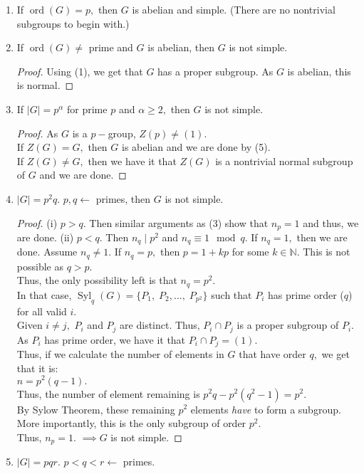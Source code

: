 \documentclass[12 pt, a4paper, toc=graduated, oneside]{article}
\theoremstyle{definition}
\newcommand{\Syl}{\operatorname{Syl}}
\newcommand{\ord}{\operatorname{ord}}
\begin{document}
\begin{enumerate}
	\item If $\ord(G) = p,$ then $G$ is abelian and simple. (There are no nontrivial subgroups to begin with.)
	\item If $\ord(G) \neq$ prime and $G$ is abelian, then $G$ is not simple.\\
	\begin{proof}
	Using (1), we get that $G$ has a proper subgroup. As $G$ is abelian, this is normal.
	\end{proof}
	\item If $|G| = p^\alpha$ for prime $p$ and $\alpha \ge 2,$ then $G$ is not simple.
	\begin{proof}
		As $G$ is a $p-$group, $Z(p) \neq (1).$\\
		If $Z(G) = G,$ then $G$ is abelian and we are done by (5).\\
		If $Z(G) \neq G,$ then we have it that $Z(G)$ is a nontrivial normal subgroup of $G$ and we are done.
	\end{proof}	
	\item $|G| = p^2q.$ $p, q \longleftarrow$ primes, then $G$ is not simple.
	\begin{proof}
		(i) $p > q.$ Then similar arguments as (3) show that $n_p = 1$ and thus, we are done.
		(ii) $p < q.$ Then $n_q \mid p^2$ and $n_q \equiv 1 \mod q.$ If $n_q = 1,$ then we are done. Assume $n_q \neq 1.$ If $n_q = p,$ then $p = 1 + kp$ for some $k \in \mathbb{N}.$ This is not possible as $q > p.$\\
		Thus, the only possibility left is that $n_q = p^2.$\\
		In that case, $\Syl_q(G) = \{P_1,\;P_2, \ldots,\; P_{p^2}\}$ such that $P_i$ has prime order ($q$) for all valid $i.$\\
		Given $i \neq j,$ $P_i$ and $P_j$ are distinct. Thus, $P_i \cap P_j$ is a proper subgroup of $P_i.$ As $P_i$ has prime order, we have it that $P_i \cap P_j = (1).$\\
		Thus, if we calculate the number of elements in $G$ that have order $q,$ we get that it is:\\
		$n = p^2(q - 1).$\\
		Thus, the number of element remaining is $p^2q - p^2(q^2 - 1) = p^2.$\\
		By Sylow Theorem, these remaining $p^2$ elements \emph{have} to form a subgroup. More importantly, this is the only subgroup of order $p^2.$ \\
		Thus, $n_p = 1.$ $\implies G$ is not simple.
	\end{proof}
	\item $|G| = pqr.$ $p < q < r \longleftarrow$ primes.\\

\end{enumerate}
\end{document}
